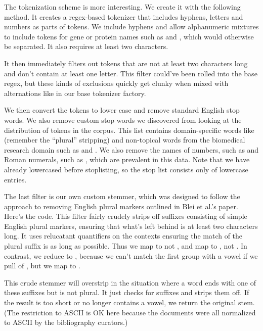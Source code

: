 The tokenization scheme is more interesting.  We create it with
the following method.
%
%
It creates a regex-based tokenizer that includes hyphens, letters and
numbers as parts of tokens.  We include hyphens and allow alphanumeric
mixtures to include tokens for gene or protein names such as
 and , which would otherwise be
separated.  It also requires at least two characters.

It then immediately filters out tokens that are not at least two
characters long and don't contain at least one letter.  This filter
could've been rolled into the base regex, but these kinds of
exclusions quickly get clunky when mixed with alternations like in
our base tokenizer factory.  

We then convert the tokens to lower case and remove standard English
stop words.  We also remove custom stop words we discovered from
looking at the distribution of tokens in the corpus.  This list
contains domain-specific words like  (remember
the ``plural'' stripping) and non-topical words from the biomedical
research domain such as  and
.  We also remove the names of numbers, such
as  and Roman numerals, such as ,
which are prevalent in this data.  Note that we have already lowercased
before stoplisting, so the stop list consists only of lowercase
entries.

The last filter is our own custom stemmer, which was designed to
follow the approach to removing English plural markers outlined in
Blei et al.'s paper.  Here's the code.
%
%
This filter fairly crudely strips off suffixes consisting of simple
English plural markers, ensuring that what's left behind is at least
two characters long.  It uses relucatant quantifiers on the contexts
ensuring the match of the plural suffix is as long as possible.  Thus
we map  to  not
, and map  to
, not .  In contrast, we
reduce  to , because we can't
match the first group with a vowel if we pull of ,
but we map  to .  

This crude stemmer will overstrip in the situation where a word ends
with one of these suffixes but is not plural.  It just checks for
suffixes and strips them off.  If the result is too short or no longer
contains a vowel, we return the original stem.  (The restriction to
ASCII is OK here because the documents were all normalized to ASCII by
the bibliography curators.)


